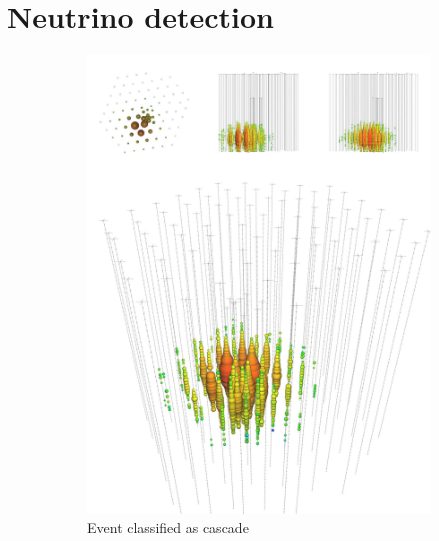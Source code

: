 \section{Neutrino detection}
\begin{figure}\label{fig:events}
    \begin{center}
        \begin{subfigure}{0.49\textwidth}
            \centering
            \includegraphics[clip, trim=0cm 0cm 0cm 30cm, width=1\textwidth]{figures/cascade_event.pdf}
            \caption{Event classified as cascade}  
            \label{fig:events_cascade}
          \end{subfigure}
        \begin{subfigure}{0.49\textwidth}
            \centering

\end{subfigure}
\end{center}
\end{figure}
